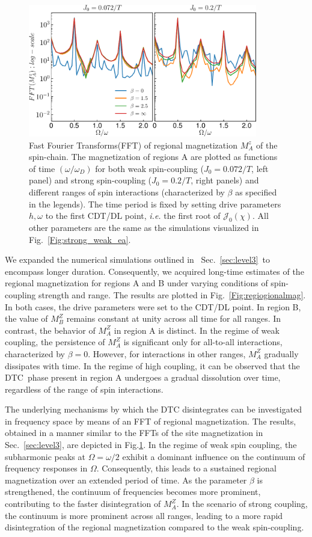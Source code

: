 \documentclass[12pt]{iopart}
\begin{document}
\begin{figure}[h!]
	\centering
	\includegraphics[width = 10cm]{mz_betas.pdf}
	\caption{
		Fast Fourier Transforms(FFT) of regional magnetization $M^z_{A}$ of the spin-chain. The magnetization of regions A are plotted as functions of time $(\omega/\omega_D)$ for both weak spin-coupling ($J_0=0.072/T$, left panel) and strong spin-coupling ($J_0=0.2/T$, right panels) and different ranges of spin interactions (characterized by $\beta$ as specified in the legends). The time period is fixed by setting drive parameters $h,\omega$ to the first CDT/DL point, \textit{i.e.} the first root of $\mathcal{J}_0(\chi)$. All other parameters are the same as the simulations visualized in Fig.~\ref{Fig:strong_weak_ea}.}
	\label{Fig:regionalFFT}
\end{figure}
We expanded the numerical simulations outlined in  Sec.~\ref{sec:level3} to encompass longer duration. Consequently, we acquired long-time estimates of the regional magnetization for regions A and B under varying conditions of spin-coupling strength and range. The results are plotted in Fig.~\ref{Fig:regiogionalmag}. In both cases, the drive parameters were set to the CDT/DL point. In region B, the value of $M^Z_B$ remains constant at unity across all time for all ranges. In contrast, the behavior of $M^Z_A$ in region A is distinct. In the regime of weak coupling, the persistence of $M^Z_A$ is significant only for all-to-all interactions, characterized by $\beta=0$. However, for interactions in other ranges, $M^Z_A$ gradually dissipates with time. In the regime of high coupling, it can be observed that the DTC phase present in region A undergoes a gradual dissolution over time, regardless of the range of spin interactions. 

The underlying mechanisms by which the DTC disintegrates can be investigated in frequency space by means of an FFT of regional magnetization. The results, obtained in a manner similar to the FFTs of the site magnetization in Sec.~\ref{sec:level3}, are depicted in Fig.\ref{Fig:regionalFFT}. In the regime of weak spin coupling, the subharmonic peaks at $\Omega=\omega/2$ exhibit a dominant influence on the continuum of frequency responses in $\Omega$. Consequently, this leads to a sustained regional magnetization over an extended period of time. As the parameter $\beta$ is strengthened,  the continuum of frequencies becomes more prominent, contributing to the faster disintegration of $M^Z_A$. In the scenario of strong coupling, the continuum is more prominent across all ranges, leading to a more rapid disintegration of the regional magnetization compared to the weak spin-coupling.
	
\end{document}
